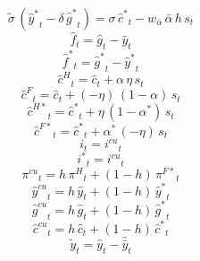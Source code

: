 \begin{dmath}
{{\tilde{\sigma}}}\, \left({{\hat y^*}}_{t}-{{\delta}}\, {{\hat g^*}}_{t}\right)={{\sigma}}\, {{\hat c^*}}_{t}-{{w_{\bar{\alpha}}}}\, {{\bar{\alpha}}}\, {{h}}\, {{s}}_{t}
\end{dmath}
\begin{dmath}
{{\hat f}}_{t}={{\hat g}}_{t}-{{\hat y}}_{t}
\end{dmath}
\begin{dmath}
{{\hat f^*}}_{t}={{\hat g^*}}_{t}-{{\hat y^*}}_{t}
\end{dmath}
\begin{dmath}
{{\hat c^H}}_{t}={{\hat c}}_{t}+{{\alpha}}\, {{\eta}}\, {{s}}_{t}
\end{dmath}
\begin{dmath}
{{\hat c^F}}_{t}={{\hat c}}_{t}+\left(-{{\eta}}\right)\, \left(1-{{\alpha}}\right)\, {{s}}_{t}
\end{dmath}
\begin{dmath}
{{\hat c^{H*}}}_{t}={{\hat c^*}}_{t}+{{\eta}}\, \left(1-{{\alpha^*}}\right)\, {{s}}_{t}
\end{dmath}
\begin{dmath}
{{\hat c^{F*}}}_{t}={{\hat c^*}}_{t}+{{\alpha^*}}\, \left(-{{\eta}}\right)\, {{s}}_{t}
\end{dmath}
\begin{dmath}
{{i}}_{t}={{i^{cu}}}_{t}
\end{dmath}
\begin{dmath}
{{i^*}}_{t}={{i^{cu}}}_{t}
\end{dmath}
\begin{dmath}
{{\pi^{cu}}}_{t}={{h}}\, {{\pi^H}}_{t}+\left(1-{{h}}\right)\, {{\pi^{F*}}}_{t}
\end{dmath}
\begin{dmath}
{{\hat y^{cu}}}_{t}={{h}}\, {{\hat y}}_{t}+\left(1-{{h}}\right)\, {{\hat y^*}}_{t}
\end{dmath}
\begin{dmath}
{{\hat g^{cu}}}_{t}={{h}}\, {{\hat g}}_{t}+\left(1-{{h}}\right)\, {{\hat g^*}}_{t}
\end{dmath}
\begin{dmath}
{{\hat c^{cu}}}_{t}={{h}}\, {{\hat c}}_{t}+\left(1-{{h}}\right)\, {{\hat c^*}}_{t}
\end{dmath}
\begin{dmath}
{{\tilde y}}_{t}={{\hat y}}_{t}-{{\hat {\bar y}}}_{t}
\end{dmath}
